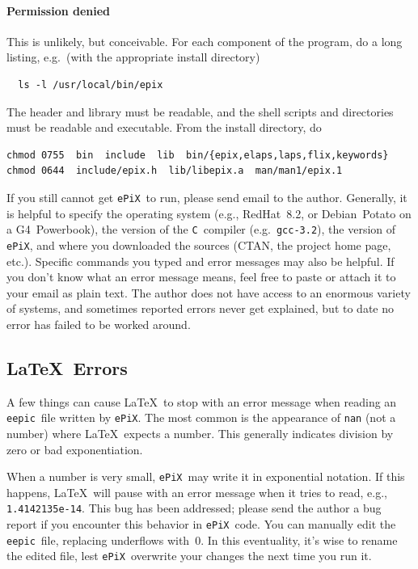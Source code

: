 \documentclass[12pt]{report}
\newcommand{\code}[1]{\texttt{#1}}
\newcommand{\ePiX}{\code{ePiX}}
\newcommand{\eepic}{\code{eepic}}
\newcommand{\C}{\code{C}}
\begin{document}
\paragraph{Permission denied} This is  unlikely, but conceivable. For
each component of the program, do a long listing, e.g.\ (with the
appropriate install directory)
\begin{verbatim}
  ls -l /usr/local/bin/epix
\end{verbatim}
The header and library must be readable, and the shell scripts and
directories must be readable and executable. From the install
directory, do
\begin{verbatim}
chmod 0755  bin  include  lib  bin/{epix,elaps,laps,flix,keywords}
chmod 0644  include/epix.h  lib/libepix.a  man/man1/epix.1
\end{verbatim}

If you still cannot get \ePiX\ to run, please send email to the
author. Generally, it is helpful to specify the operating system
(e.g., RedHat~8.2, or Debian~Potato on a G4~Powerbook), the version of
the \C~compiler (e.g.~\code{gcc-3.2}), the version of \ePiX, and
where you downloaded the sources (CTAN, the project home page, etc.).
Specific commands you typed and error messages may also be helpful. If
you don't know what an error message means, feel free to paste or
attach it to your email as plain text. The author does not have access
to an enormous variety of systems, and sometimes reported errors never
get explained, but to date no error has failed to be worked around.


\subsection*{\LaTeX\ Errors}

A few things can cause \LaTeX\ to stop with an error message when
reading an \eepic\ file written by \ePiX. The most common is the
appearance of \code{nan} (not a number) where \LaTeX\ expects a
number. This generally indicates division by zero or bad
exponentiation.

When a number is very small, \ePiX\ may write it in exponential
notation. If this happens, \LaTeX\ will pause with an error message
when it tries to read, e.g., \code{1.4142135e-14}. This bug has been
addressed; please send the author a bug report if you encounter this
behavior in \ePiX\ code. You can manually edit the \eepic\ file,
replacing underflows with~$0$. In this eventuality, it's wise to
rename the edited file, lest \ePiX\ overwrite your changes the next
time you run it.
\end{document}
